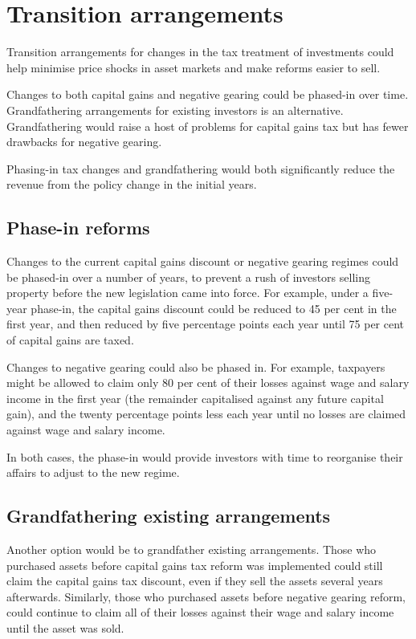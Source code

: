 \chapter{Transition arrangements}
Transition arrangements for changes in the tax treatment of investments could help minimise price shocks in asset markets and make reforms easier to sell. 

Changes to both capital gains and negative gearing could be phased-in over time. Grandfathering arrangements for existing investors is an alternative. Grandfathering would raise a host of problems for capital gains tax but has fewer drawbacks for negative gearing. 

Phasing-in tax changes and grandfathering would both significantly reduce the revenue from the policy change in the initial years. 

\section{Phase-in reforms}
Changes to the current capital gains discount or negative gearing regimes could be phased-in over a number of years, to prevent a rush of investors selling property before the new legislation came into force. For example, under a five-year phase-in, the capital gains discount could be reduced to 45 per cent in the first year, and then reduced by five percentage points each year until 75 per cent of capital gains are taxed. 

Changes to negative gearing could also be phased in. For example, taxpayers might be allowed to claim only 80 per cent of their losses against wage and salary income in the first year (the remainder capitalised against any future capital gain), and the twenty percentage points less each year until no losses are claimed against wage and salary income.

In both cases, the phase-in would provide investors with time to reorganise their affairs to adjust to the new regime.

\section{Grandfathering existing arrangements}
Another option would be to grandfather existing arrangements. Those who purchased assets before capital gains tax reform was implemented could still claim the capital gains tax discount, even if they sell the assets several years afterwards. Similarly, those who purchased assets before negative gearing reform, could continue to claim all of their losses against their wage and salary income until the asset was sold.

